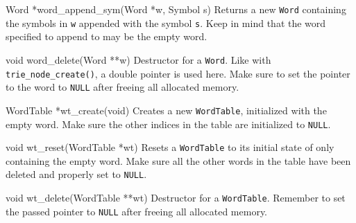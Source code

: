 \begin{funcdoc}{Word *word\_append\_sym(Word *w, Symbol s)}
  Returns a new \texttt{Word} containing the symbols in \texttt{w} appended with
  the symbol \texttt{s}. Keep in mind that the word specified to append to may
  be the empty word.
\end{funcdoc}

\begin{funcdoc}{void word\_delete(Word **w)}
  Destructor for a \texttt{Word}. Like with \texttt{trie\_node\_create()}, a
  double pointer is used here. Make sure to set the pointer to the word to
  \texttt{NULL} after freeing all allocated memory.
\end{funcdoc}

\begin{funcdoc}{WordTable *wt\_create(void)}
  Creates a new \texttt{WordTable}, initialized with the empty word. Make sure
  the other indices in the table are initialized to \texttt{NULL}.
\end{funcdoc}

\begin{funcdoc}{void wt\_reset(WordTable *wt)}
  Resets a \texttt{WordTable} to its initial state of only containing the empty
  word. Make sure all the other words in the table have been deleted and
  properly set to \texttt{NULL}.
\end{funcdoc}

\begin{funcdoc}{void wt\_delete(WordTable **wt)}
  Destructor for a \texttt{WordTable}. Remember to set the passed pointer to
  \texttt{NULL} after freeing all allocated memory.
\end{funcdoc}
